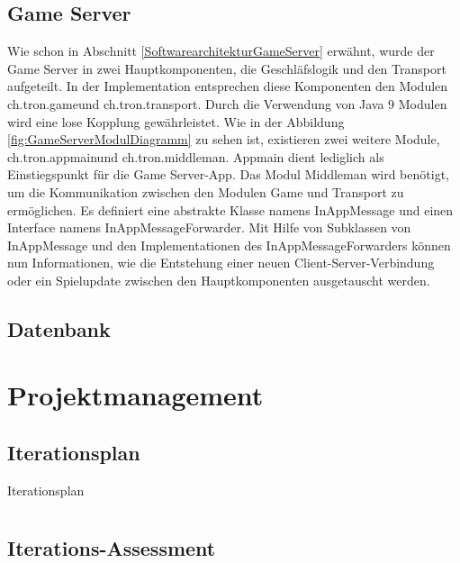 \documentclass[11pt,ngerman]{article}
\begin{document}
    \subsection{\Gls{Game Server}}
    Wie schon in Abschnitt \ref{SoftwarearchitekturGameServer} erwähnt, wurde der \Gls{Game Server} in zwei Hauptkomponenten, die Geschläfslogik und den Transport aufgeteilt. In der Implementation entsprechen diese Komponenten den Modulen \dq ch.tron.game\dq und \dq ch.tron.transport\dq. Durch die Verwendung von Java 9 Modulen wird eine lose Kopplung gewährleistet. Wie in der Abbildung \ref{fig:GameServerModulDiagramm} zu sehen ist, existieren zwei weitere Module, \dq ch.tron.appmain\dq und \dq ch.tron.middleman\dq. Appmain dient lediglich als Einstiegspunkt für die \Gls{Game Server}-App. Das Modul Middleman wird benötigt, um die Kommunikation zwischen den Modulen Game und Transport zu ermöglichen. Es definiert eine abstrakte Klasse namens InAppMessage und einen Interface namens InAppMessageForwarder. Mit Hilfe von Subklassen von InAppMessage und den Implementationen des InAppMessageForwarders können nun Informationen, wie die Entstehung einer neuen Client-Server-Verbindung oder ein Spielupdate zwischen den Hauptkomponenten ausgetauscht werden.

    \subsection{Datenbank}

    \section{Projektmanagement}

    \subsection{Iterationsplan}

    \begin{table}[H]
        \caption{Iterationsplan}
        \begin{tabularx}{\textwidth}{X}
            \toprule

            \bottomrule
        \end{tabularx}
        \label{tab:Iterationsplan}
    \end{table}

    \subsection{Iterations-Assessment}
\end{document}
